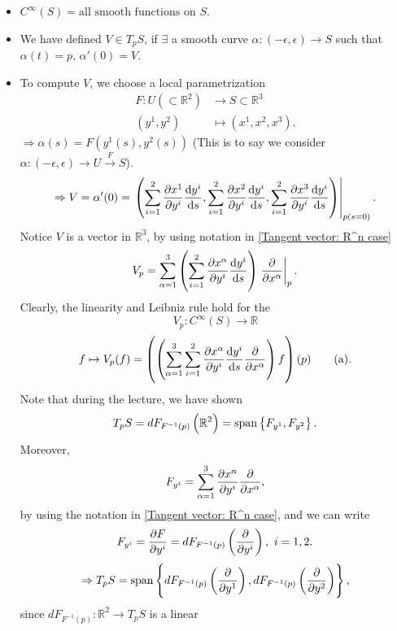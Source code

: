 \begin{enumerate}[(1)]
    \begin{itemize}
        \item \(C^\infty(S)={\text{all smooth functions on }S}\).
        \item We have defined \(V\in T_p S\), if \(\exists\) a smooth
        curve \(\alpha\colon (-\epsilon,\epsilon)\to S\) such that
        \(\alpha(t)=p\), \(\alpha'(0)=V\).
        \item To compute \(V\), we choose a local parametrization
        \begin{align*}
            F\colon U(\subset \mathbb{R}^2) &\longrightarrow S\subset \mathbb{R}^3\\
            (y^1,y^2) &\longmapsto (x^1,x^2,x^3)
        .\end{align*}
        \(\Rightarrow \alpha(s)=F\left(y^1(s),y^2(s)\right)\) (This is to 
        say we consider 
        \(\alpha\colon(-\epsilon,\epsilon)\to U
        \mathop{\longrightarrow }\limits^{F} S\)).
        \[
            \Rightarrow V=\alpha'(0)=\left.
            \left(
            \sum_{i=1}^2\pdv{x^1}{y^i}\dv{y^i}{s},
            \sum_{i=1}^2\pdv{x^2}{y^i}\dv{y^i}{s},
            \sum_{i=1}^2\pdv{x^3}{y^i}\dv{y^i}{s}
            \right)
            \right|_{p(s=0)}.
        \]
        Notice \(V\) is a vector in \(\mathbb{R}^3\), by using notation
        in \cref{Tangent vector: R^n case}
        \[
            V_p=\sum_{\alpha=1}^3\left(\sum_{i=1}^2\pdv{x^\alpha}{y^i}
            \dv{y^i}{s}\right)\left. \pdv{x^\alpha}  \right|_p.
        \]
        Clearly, the linearity and Leibniz rule hold for the 
        \[
            V_p\colon C^\infty(S)\to \mathbb{R}    
        \]
        \[
            f\mapsto V_p(f)=\left(\left(\sum_{\alpha=1}^3 \sum_{i=1}
            ^2 \pdv{x^\alpha}{y^i}\dv{y^i}{s}\pdv{x^\alpha}\right)f\right)
            (p)   \tag{a} 
        .\]
        Note that during the lecture, we have shown
        \[
            T_pS=dF_{F^{-1}(p)}\left(\mathbb{R}^2\right)=\operatorname{span}
            \left\{F_{y^1},F_{y^2}\right\}    .
        \]
        Moreover, 
        \[
            F_{y^i}=\sum_{\alpha=1}^3\pdv{x^\alpha}{y^i}\pdv
            {x^\alpha},
        \] 
        by using the notation in \cref{Tangent vector: R^n case}, 
        and we can write
        \[
            F_{y^i}=\pdv{F}{y^i}=dF_{F^{-1}(p)}\left(\pdv{y^i}\right),
            ~i=1,2.
        \]
        \[
            \Rightarrow T_p S=\operatorname{span}\left\{
                dF_{F^{-1}(p)}\left(\pdv{y^1}\right),
                dF_{F^{-1}(p)}\left(\pdv{y^2}\right)
            \right\}  ,
        \]
        since \(dF_{F^{-1}(p)}\colon \mathbb{R}^2\to T_p S\) is a linear

\end{itemize}
\end{enumerate}
